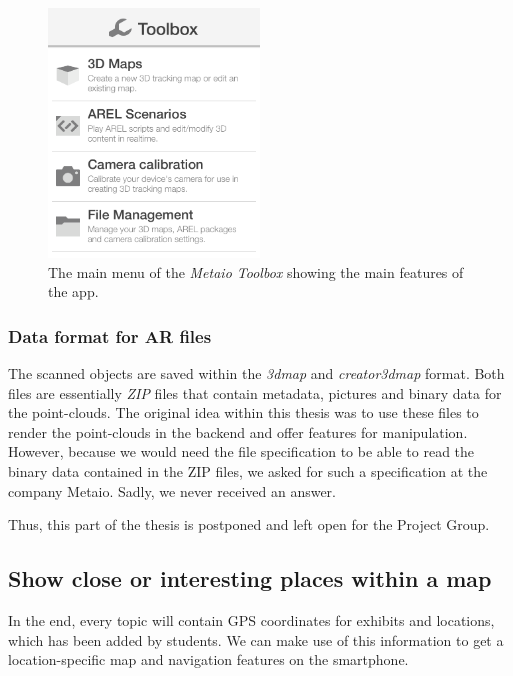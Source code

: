 \begin{figure}[th]
	\centerline{\includegraphics[width=0.5\textwidth]{gfx/toolbox.png}}
	\caption{The main menu of the \emph{Metaio Toolbox} showing the main features of the app.}
	\label{MetToolbox}
\end{figure}		

\clearpage 

\subsubsection{Data format for \ac{AR} files}
\label{creator3dmapProblem}
The scanned objects are saved within the \emph{3dmap} and \emph{creator3dmap} format. Both files are essentially \emph{ZIP} files that contain metadata, pictures and binary data for the point-clouds. The original idea within this thesis was to use these files to render the point-clouds in the backend and offer features for manipulation. However, because we would need the file specification to be able to read the binary data contained in the ZIP files, we asked for such a specification at the company Metaio. Sadly, we never received an answer. 

Thus, this part of the thesis is postponed and left open for the Project Group.

\subsection{Show close or interesting places within a map} 
In the end, every topic will contain \ac{GPS} coordinates for exhibits and locations, which has been added by students. We can make use of this information to get a location-specific map and navigation features on the smartphone. 

